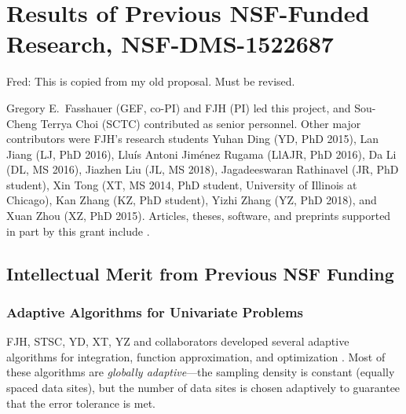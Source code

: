 \documentclass[11pt]{NSFamsart}
\newcommand{\FJHNote}[1]{{\color{blue}Fred: #1}}
\begin{document}
\section{Results of Previous NSF-Funded Research,
NSF-DMS-1522687} \label{sec:Previous}
\FJHNote{This is copied from my old proposal.  Must be revised.}

Gregory E.\ Fasshauer (GEF, co-PI) and FJH (PI) led this project, and Sou-Cheng Terrya Choi (SCTC) contributed as senior personnel.  Other major contributors were FJH's research students Yuhan Ding (YD, PhD 2015), Lan Jiang (LJ, PhD 2016), 
Llu\'is Antoni Jim\'enez Rugama (LlAJR, PhD 2016), Da Li (DL, MS 2016), Jiazhen Liu (JL, MS 2018), Jagadeeswaran Rathinavel (JR, 
PhD student), Xin Tong (XT, MS 2014, PhD student, University of Illinois at Chicago), Kan Zhang (KZ, PhD student), Yizhi Zhang (YZ, PhD 2018), and Xuan Zhou (XZ, PhD 2015).  Articles, theses,  
software, and preprints supported in 
part by this 
grant 
include 
\cite{ala_augmented_2017, 
	ChoEtal17a,
	ChoEtal17b,
	Din15a, 
	DinHic20a,
	GilEtal16a,
	Hic17a,
	HicJag18b,
	HicJim16a,
	HicEtal18a,
	HicEtal17a,
	HicKriWoz19a,
	RatHic19a,
	GilJim16b,
	JimHic16a,
	JohFasHic18a,
	Li16a,
	Liu17a,
	MarEtal18a,
	mccourt_stable_2017,
	MCCEtal19a,
	mishra_hybrid_2018,
	MisEtal19a,
	rashidinia_stable_2016,
	rashidinia_stable_2018,
	Zha18a,
	Zha17a,
	Zho15a,
	ZhoHic15a}.

\subsection{Intellectual Merit from Previous NSF Funding}
\label{previousmeritsubsec}

\subsubsection{Adaptive Algorithms for Univariate Problems} \label{sec:localadpat}
FJH, STSC, YD, XT, YZ and collaborators developed several adaptive algorithms for integration, function approximation, and optimization \cite{ChoEtal17a,HicEtal14b,  Din15a, Ton14a, Zha18a}.  Most of these algorithms are \emph{globally adaptive}---the sampling density is constant (equally spaced data sites), but the number of data sites is chosen adaptively to guarantee that the error tolerance is met.
\end{document}
